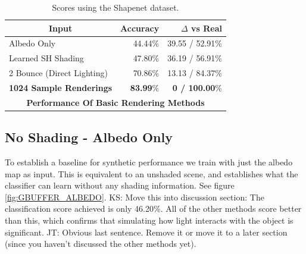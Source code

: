 \documentclass[10pt,twocolumn,letterpaper]{article}
\newcommand{\kris}[1]{{\color{red} KS: #1}}
\newcommand{\tompson}[1]{{\color{green} JT: #1}}
\begin{document}
\begin{table}[]
\centering
\begin{tabular}{|l|r|r|}
\hline
\multicolumn{1}{|c|}{\textbf{Input}}
& \multicolumn{1}{r|}{\textbf{Accuracy}}
& \multicolumn{1}{r|}{\textbf{$\Delta$ vs Real}} \\ \hline
Albedo Only 				&44.44\%	& 39.55 / 52.91\%	\\
Learned SH Shading			&47.80\%	& 36.19 / 56.91\%	\\
2 Bounce (Direct Lighting)	&70.86\%	& 13.13 / 84.37\%   \\
\textbf{1024 Sample Renderings}		& \textbf{83.99}\%	& \textbf{0 / 100.00}\%	\\ \hline
\multicolumn{3}{|c|}{\textbf{Performance Of Basic Rendering Methods}}	\\ \hline
\end{tabular}
\caption{Scores using the Shapenet dataset.}
\label{table:tblnonGI_sn}
\end{table}


\subsection{No Shading - Albedo Only}
To establish a baseline for synthetic performance we train with just the albedo map as input.  This is equivalent to an unshaded scene, and establishes what the classifier can learn without any shading information. See figure \ref{fig:GBUFFER_ALBEDO}.  \kris{Move this into discussion section: The classification score achieved is only 46.20\%. All of the other methods score better than this, which confirms that simulating how light interacts with the object is significant.} \tompson{Obvious last sentence. Remove it or move it to a later section (since you haven't discussed the other methods yet).}
\end{document}
